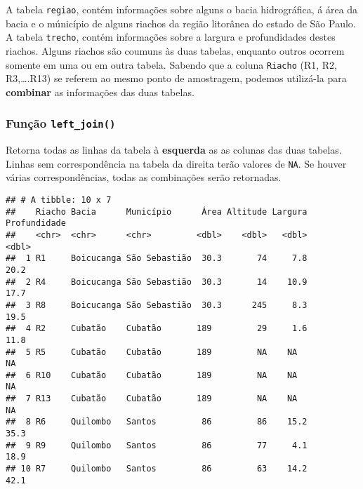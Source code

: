\documentclass[
]{book}
\newenvironment{Shaded}{\begin{snugshade}}{\end{snugshade}}
\newcommand{\DataTypeTok}[1]{\textcolor[rgb]{0.13,0.29,0.53}{#1}}
\newcommand{\KeywordTok}[1]{\textcolor[rgb]{0.13,0.29,0.53}{\textbf{#1}}}
\newcommand{\NormalTok}[1]{#1}
\newcommand{\OperatorTok}[1]{\textcolor[rgb]{0.81,0.36,0.00}{\textbf{#1}}}
\newcommand{\StringTok}[1]{\textcolor[rgb]{0.31,0.60,0.02}{#1}}
\begin{document}
A tabela \texttt{regiao}, contém informações sobre alguns o bacia hidrográfica, á área da bacia e o múnicípio de alguns riachos da região litorânea do estado de São Paulo. A tabela \texttt{trecho}, contém informações sobre a largura e profundidades destes riachos. Alguns riachos são coumuns às duas tabelas, enquanto outros ocorrem somente em uma ou em outra tabela. Sabendo que a coluna \texttt{Riacho} (R1, R2, R3,\ldots.R13) se referem ao mesmo ponto de amostragem, podemos utilizá-la para \textbf{combinar} as informações das duas tabelas.

\hypertarget{funuxe7uxe3o-left_join}{%
\subsubsection{\texorpdfstring{Função \texttt{left\_join()}}{Função left\_join()}}\label{funuxe7uxe3o-left_join}}

Retorna todas as linhas da tabela à \textbf{esquerda} as as colunas das duas tabelas. Linhas sem correspondência na tabela da direita terão valores de \texttt{NA}. Se houver várias correspondências, todas as combinações serão retornadas.

\begin{Shaded}
\end{Shaded}

\begin{verbatim}
## # A tibble: 10 x 7
##    Riacho Bacia      Município      Área Altitude Largura Profundidade
##    <chr>  <chr>      <chr>         <dbl>    <dbl>   <dbl>        <dbl>
##  1 R1     Boicucanga São Sebastião  30.3       74     7.8         20.2
##  2 R4     Boicucanga São Sebastião  30.3       14    10.9         17.7
##  3 R8     Boicucanga São Sebastião  30.3      245     8.3         19.5
##  4 R2     Cubatão    Cubatão       189         29     1.6         11.8
##  5 R5     Cubatão    Cubatão       189         NA    NA           NA  
##  6 R10    Cubatão    Cubatão       189         NA    NA           NA  
##  7 R13    Cubatão    Cubatão       189         NA    NA           NA  
##  8 R6     Quilombo   Santos         86         86    15.2         35.3
##  9 R9     Quilombo   Santos         86         77     4.1         18.9
## 10 R7     Quilombo   Santos         86         63    14.2         42.1
\end{verbatim}
\end{document}
